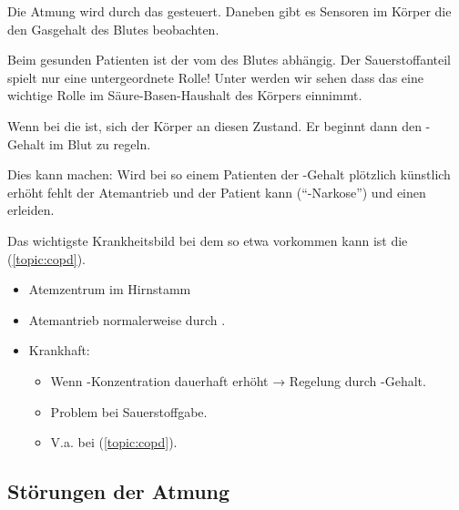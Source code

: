 



{
Die Atmung wird durch das  gesteuert. Daneben gibt
es Sensoren im Körper die den Gasgehalt des Blutes beobachten. 

Beim gesunden Patienten ist der  vom  des
Blutes abhängig. Der Sauerstoffanteil spielt nur eine untergeordnete Rolle!
Unter  werden wir sehen dass das 
eine wichtige Rolle im Säure-Basen-Haushalt des Körpers einnimmt.  

Wenn bei  die  ist,  sich der Körper an diesen Zustand. Er beginnt
dann den -Gehalt im Blut zu regeln.

Dies kann  machen: Wird bei so einem Patienten der -Gehalt
plötzlich künstlich erhöht fehlt der Atemantrieb und der Patient kann
 ("`-Narkose"') und einen
 erleiden.

Das wichtigste Krankheitsbild bei dem so etwa vorkommen kann ist die
 (\ref{topic:copd}). 
}{
\begin{itemize}
  \item Atemzentrum im Hirnstamm
  \item Atemantrieb normalerweise durch .
  \item Krankhaft:
  \begin{itemize}
    \item Wenn -Konzentration dauerhaft erhöht → Regelung durch
    -Gehalt.
    \item Problem bei Sauerstoffgabe.
    \item V.a. bei  (\ref{topic:copd}).
  \end{itemize}
\end{itemize}
}{}{}{}






\subsection{Störungen der Atmung}

